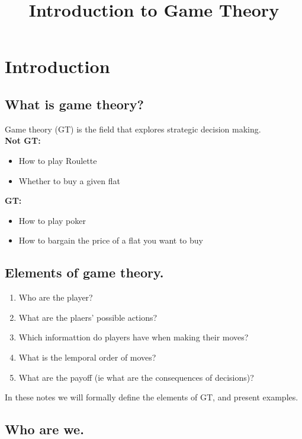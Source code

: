 \documentclass{article}
\title{Introduction to Game Theory}
\date{}
\begin{document}
\maketitle

\section{Introduction}

\subsection{What is game theory?}
Game theory (GT) is the field that explores strategic decision making. \\

\textbf{Not GT:}
\begin{itemize}
    \item How to play Roulette
    \item Whether to buy a given flat
\end{itemize}

\textbf{GT:}
\begin{itemize}
    \item How to play poker
    \item How to bargain the price of a flat you want to buy
\end{itemize}

\subsection{Elements of game theory.}

\begin{enumerate}
    \item Who are the player?
    \item What are the plaers' possible actions?
    \item Which informattion do players have when making their moves?
    \item What is the lemporal order of moves?
    \item What are the payoff (ie what are the consequences of decisions)?
\end{enumerate}

In these notes we will formally define the elements of GT, and present examples.

\subsection{Who are we.}
\end{document}
